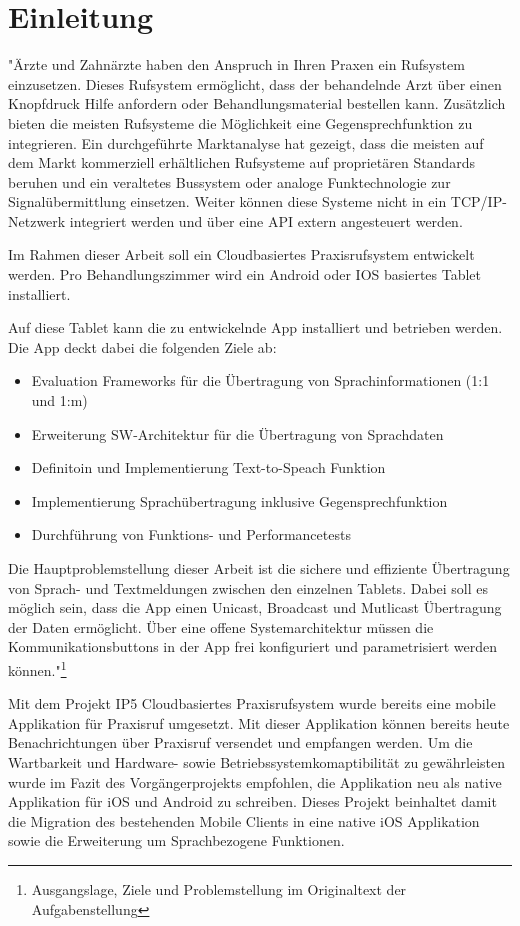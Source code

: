 \section{Einleitung}
"Ärzte und Zahnärzte haben den Anspruch in Ihren Praxen ein Rufsystem einzusetzen.
Dieses Rufsystem ermöglicht, dass der behandelnde Arzt über einen Knopfdruck Hilfe anfordern oder Behandlungsmaterial bestellen kann.
Zusätzlich bieten die meisten Rufsysteme die Möglichkeit eine Gegensprechfunktion zu integrieren.
Ein durchgeführte Marktanalyse hat gezeigt, dass die meisten auf dem Markt kommerziell erhältlichen Rufsysteme auf proprietären Standards beruhen und ein veraltetes Bussystem oder analoge Funktechnologie zur Signalübermittlung einsetzen.
Weiter können diese Systeme nicht in ein TCP/IP-Netzwerk integriert werden und über eine API extern angesteuert werden.

Im Rahmen dieser Arbeit soll ein Cloudbasiertes Praxisrufsystem entwickelt werden.
Pro Behandlungszimmer wird ein Android oder IOS basiertes Tablet installiert.

Auf diese Tablet kann die zu entwickelnde App installiert und betrieben werden.
Die App deckt dabei die folgenden Ziele ab:

\begin{itemize}
    \item Evaluation Frameworks für die Übertragung von Sprachinformationen (1:1 und 1:m)
    \item Erweiterung SW-Architektur für die Übertragung von Sprachdaten
    \item Definitoin und Implementierung Text-to-Speach Funktion
    \item Implementierung Sprachübertragung inklusive Gegensprechfunktion
    \item Durchführung von Funktions- und Performancetests
\end{itemize}

Die Hauptproblemstellung dieser Arbeit ist die sichere und effiziente Übertragung von Sprach- und Textmeldungen zwischen den einzelnen Tablets.
Dabei soll es möglich sein, dass die App einen Unicast, Broadcast und Mutlicast Übertragung der Daten ermöglicht.
Über eine offene Systemarchitektur müssen die Kommunikationsbuttons in der App frei konfiguriert und parametrisiert werden können."\footnote{Ausgangslage, Ziele und Problemstellung im Originaltext der Aufgabenstellung}\cite{aufgabenstellung}

Mit dem Projekt IP5 Cloudbasiertes Praxisrufsystem\cite{ip5} wurde bereits eine mobile Applikation für Praxisruf umgesetzt.
Mit dieser Applikation können bereits heute Benachrichtungen über Praxisruf versendet und empfangen werden.
Um die Wartbarkeit und Hardware- sowie Betriebssystemkomaptibilität zu gewährleisten wurde im Fazit des Vorgängerprojekts empfohlen, die Applikation neu als native Applikation für iOS und Android zu schreiben.\cite{ip5}
Dieses Projekt beinhaltet damit die Migration des bestehenden Mobile Clients in eine native iOS Applikation sowie die Erweiterung um Sprachbezogene Funktionen.

